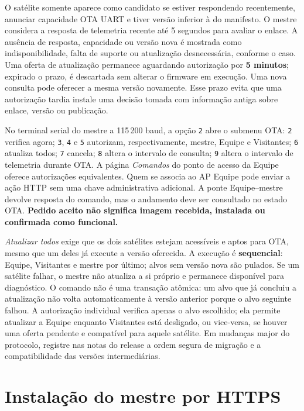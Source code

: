 O satélite somente aparece como candidato se estiver respondendo recentemente, anunciar capacidade OTA UART e tiver versão inferior à do manifesto. O mestre considera a resposta de telemetria recente até 5 segundos para avaliar o enlace. A ausência de resposta, capacidade ou versão nova é mostrada como indisponibilidade, falta de suporte ou atualização desnecessária, conforme o caso. Uma oferta de atualização permanece aguardando autorização por \textbf{5 minutos}; expirado o prazo, é descartada sem alterar o firmware em execução. Uma nova consulta pode oferecer a mesma versão novamente. Esse prazo evita que uma autorização tardia instale uma decisão tomada com informação antiga sobre enlace, versão ou publicação.

No terminal serial do mestre a 115\,200 baud, a opção \texttt{2} abre o submenu OTA: \texttt{2} verifica agora; \texttt{3}, \texttt{4} e \texttt{5} autorizam, respectivamente, mestre, Equipe e Visitantes; \texttt{6} atualiza todos; \texttt{7} cancela; \texttt{8} altera o intervalo de consulta; \texttt{9} altera o intervalo de telemetria durante OTA. A página \emph{Comandos} do ponto de acesso da Equipe oferece autorizações equivalentes. Quem se associa ao AP Equipe pode enviar a ação HTTP sem uma chave administrativa adicional. A ponte Equipe--mestre devolve resposta do comando, mas o andamento deve ser consultado no estado OTA. \textbf{Pedido aceito não significa imagem recebida, instalada ou confirmada como funcional.}

\emph{Atualizar todos} exige que os dois satélites estejam acessíveis e aptos para OTA, mesmo que um deles já execute a versão oferecida. A execução é \textbf{sequencial}: Equipe, Visitantes e mestre por último; alvos sem versão nova são pulados. Se um satélite falhar, o mestre não atualiza a si próprio e permanece disponível para diagnóstico. O comando não é uma transação atômica: um alvo que já concluiu a atualização não volta automaticamente à versão anterior porque o alvo seguinte falhou. A autorização individual verifica apenas o alvo escolhido; ela permite atualizar a Equipe enquanto Visitantes está desligado, ou vice-versa, se houver uma oferta pendente e compatível para aquele satélite. Em mudanças major do protocolo, registre nas notas do release a ordem segura de migração e a compatibilidade das versões intermediárias.

\section{Instalação do mestre por HTTPS}

